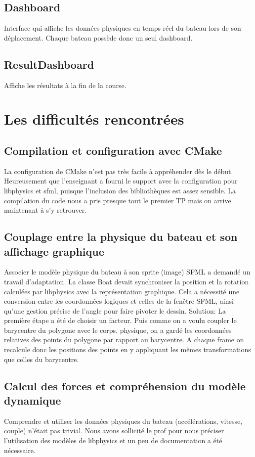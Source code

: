 \documentclass[a4paper,margin=1cm,11pt]{report}
\begin{document}
\section{Dashboard}
Interface qui affiche les données physiques en temps réel du bateau lors de son déplacement. Chaque bateau possède donc un seul dashboard.

\section{ResultDashboard}
Affiche les résultats à la fin de la course.

\chapter{Les difficultés rencontrées}

\section{Compilation et configuration avec CMake}
La configuration de CMake n’est pas très facile à appréhender dès le début. Heureusement que l’enseignant a fourni le support avec la configuration pour libphysics et sfml, puisque l’inclusion des bibliothèques est assez sensible. 
La compilation du code nous a pris presque tout le premier TP mais on arrive maintenant à s’y retrouver.

\section{Couplage entre la physique du bateau et son affichage graphique}
Associer le modèle physique du bateau à son sprite (image) SFML a demandé un travail d’adaptation. La classe Boat devait synchroniser la position et la rotation calculées par libphysics avec la représentation graphique. Cela a nécessité une conversion entre les coordonnées logiques et celles de la fenêtre SFML, ainsi qu'une gestion précise de l’angle pour faire pivoter le dessin.
Solution:
La première étape a été de choisir un facteur.
Puis comme on a voulu coupler le barycentre du polygone avec le corps, physique, on a gardé les coordonnées relatives des points du polygone par rapport au barycentre.
A chaque frame on recalcule donc les positions des points en y appliquant les mêmes transformations que celles du barycentre.

\section{Calcul des forces et compréhension du modèle dynamique}
Comprendre et utiliser les données physiques du bateau (accélérations, vitesse, couple) n'était pas trivial. Nous avons sollicité le prof pour nous préciser l’utilisation des modèles de libphysics et un peu de documentation a été nécessaire.
\end{document}
